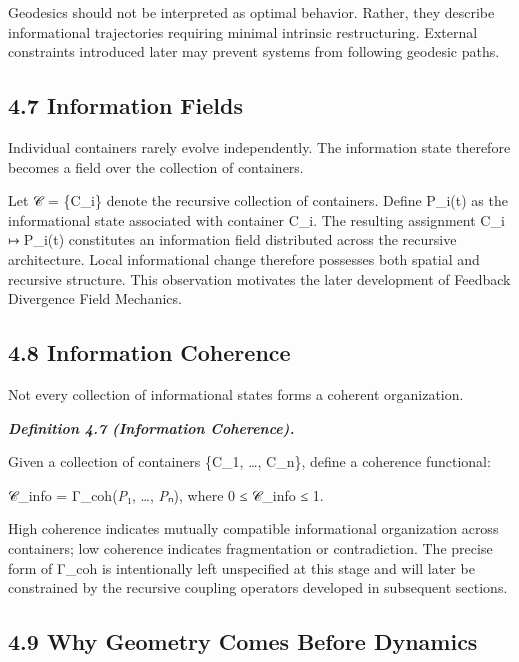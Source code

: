 \documentclass[
]{article}
\begin{document}
Geodesics should not be interpreted as optimal behavior. Rather, they
describe informational trajectories requiring minimal intrinsic
restructuring. External constraints introduced later may prevent systems
from following geodesic paths.

\hypertarget{information-fields}{%
\subsection{4.7 Information Fields}\label{information-fields}}

Individual containers rarely evolve independently. The information state
therefore becomes a field over the collection of containers.

Let 𝒞 = \{C\_i\} denote the recursive collection of containers. Define
P\_i(t) as the informational state associated with container C\_i. The
resulting assignment C\_i ↦ P\_i(t) constitutes an information field
distributed across the recursive architecture. Local informational
change therefore possesses both spatial and recursive structure. This
observation motivates the later development of Feedback Divergence Field
Mechanics.

\hypertarget{information-coherence}{%
\subsection{4.8 Information Coherence}\label{information-coherence}}

Not every collection of informational states forms a coherent
organization.

\emph{\textbf{Definition 4.7 (Information Coherence).}}

Given a collection of containers \{C\_1, \ldots, C\_n\}, define a
coherence functional:

𝒞\_info = Γ\_coh(\emph{P}₁, \ldots, \emph{P}ₙ), where 0 ≤ 𝒞\_info ≤ 1.

High coherence indicates mutually compatible informational organization
across containers; low coherence indicates fragmentation or
contradiction. The precise form of Γ\_coh is intentionally left
unspecified at this stage and will later be constrained by the recursive
coupling operators developed in subsequent sections.

\hypertarget{why-geometry-comes-before-dynamics}{%
\subsection{4.9 Why Geometry Comes Before
Dynamics}\label{why-geometry-comes-before-dynamics}}
\end{document}
